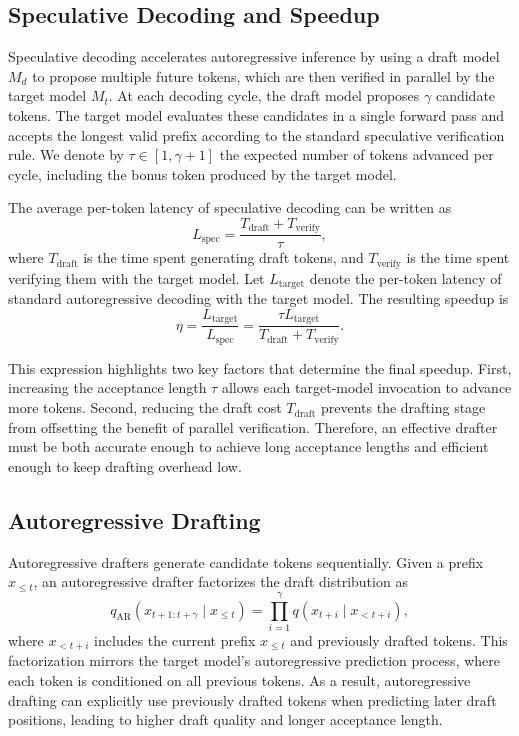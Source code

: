 \subsection{Speculative Decoding and Speedup}
Speculative decoding accelerates autoregressive inference by using a draft model \(M_d\) to propose multiple future tokens, which are then verified in parallel by the target model \(M_t\). At each decoding cycle, the draft model proposes \(\gamma\) candidate tokens. The target model evaluates these candidates in a single forward pass and accepts the longest valid prefix according to the standard speculative verification rule. We denote by \(\tau \in [1, \gamma+1]\) the expected number of tokens advanced per cycle, including the bonus token produced by the target model.

The average per-token latency of speculative decoding can be written as
\[
L_{\mathrm{spec}}
=
\frac{T_{\mathrm{draft}} + T_{\mathrm{verify}}}{\tau},
\]
where \(T_{\mathrm{draft}}\) is the time spent generating draft tokens, and \(T_{\mathrm{verify}}\) is the time spent verifying them with the target model. Let \(L_{\mathrm{target}}\) denote the per-token latency of standard autoregressive decoding with the target model. The resulting speedup is
\[
\eta
=
\frac{L_{\mathrm{target}}}{L_{\mathrm{spec}}}
=
\frac{\tau L_{\mathrm{target}}}
{T_{\mathrm{draft}} + T_{\mathrm{verify}}}.
\]

This expression highlights two key factors that determine the final speedup. First, increasing the acceptance length \(\tau\) allows each target-model invocation to advance more tokens. Second, reducing the draft cost \(T_{\mathrm{draft}}\) prevents the drafting stage from offsetting the benefit of parallel verification. Therefore, an effective drafter must be both accurate enough to achieve long acceptance lengths and efficient enough to keep drafting overhead low.

\subsection{Autoregressive Drafting}

Autoregressive drafters generate candidate tokens sequentially. Given a prefix \(x_{\le t}\), an autoregressive drafter factorizes the draft distribution as
\[
q_{\mathrm{AR}}(x_{t+1:t+\gamma} \mid x_{\le t})
=
\prod_{i=1}^{\gamma}
q(x_{t+i} \mid x_{<t+i}),
\]
where \(x_{<t+i}\) includes the current prefix \(x_{\le t}\) and previously drafted tokens.
This factorization mirrors the target model's autoregressive prediction process, where each token is conditioned on all previous tokens. As a result, autoregressive drafting can explicitly use previously drafted tokens when predicting later draft positions, leading to higher draft quality and longer acceptance length.

